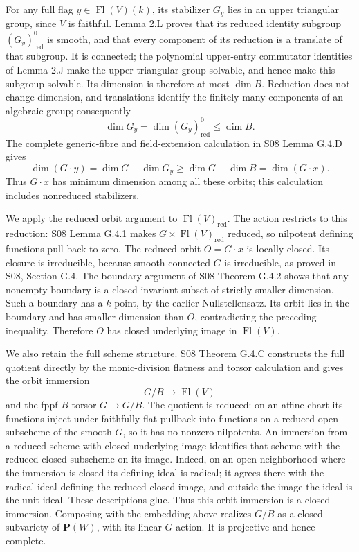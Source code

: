\documentclass[11pt,a4paper,openany]{report}
\newcounter{none}
\begin{document}
For any full flag \(y\in\operatorname{Fl}(V)(k)\), its stabilizer \(G_y\) lies in an upper triangular group, since \(V\) is faithful. Lemma 2.L proves that its reduced identity subgroup \((G_y)_{\mathrm{red}}^0\) is smooth, and that every component of its reduction is a translate of that subgroup. It is connected; the polynomial upper-entry commutator identities of Lemma 2.J make the upper triangular group solvable, and hence make this subgroup solvable. Its dimension is therefore at most \(\dim B\). Reduction does not change dimension, and translations identify the finitely many components of an algebraic group; consequently \[
 \dim G_y=\dim (G_y)_{\mathrm{red}}^0\le\dim B.
\] The complete generic-fibre and field-extension calculation in S08 Lemma G.4.D gives \[
 \dim(G\cdot y)=\dim G-\dim G_y
                       \ge\dim G-\dim B=\dim(G\cdot x).
\] Thus \(G\cdot x\) has minimum dimension among all these orbits; this calculation includes nonreduced stabilizers.

We apply the reduced orbit argument to \(\operatorname{Fl}(V)_{\mathrm{red}}\). The action restricts to this reduction: S08 Lemma G.4.1 makes \(G\times\operatorname{Fl}(V)_{\mathrm{red}}\) reduced, so nilpotent defining functions pull back to zero. The reduced orbit \(O=G\cdot x\) is locally closed. Its closure is irreducible, because smooth connected \(G\) is irreducible, as proved in S08, Section G.4. The boundary argument of S08 Theorem G.4.2 shows that any nonempty boundary is a closed invariant subset of strictly smaller dimension. Such a boundary has a \(k\)-point, by the earlier Nullstellensatz. Its orbit lies in the boundary and has smaller dimension than \(O\), contradicting the preceding inequality. Therefore \(O\) has closed underlying image in \(\operatorname{Fl}(V)\).

We also retain the full scheme structure. S08 Theorem G.4.C constructs the full quotient directly by the monic-division flatness and torsor calculation and gives the orbit immersion \[
             G/B\longrightarrow\operatorname{Fl}(V)
\] and the fppf \(B\)-torsor \(G\to G/B\). The quotient is reduced: on an affine chart its functions inject under faithfully flat pullback into functions on a reduced open subscheme of the smooth \(G\), so it has no nonzero nilpotents. An immersion from a reduced scheme with closed underlying image identifies that scheme with the reduced closed subscheme on its image. Indeed, on an open neighborhood where the immersion is closed its defining ideal is radical; it agrees there with the radical ideal defining the reduced closed image, and outside the image the ideal is the unit ideal. These descriptions glue. Thus this orbit immersion is a closed immersion. Composing with the embedding above realizes \(G/B\) as a closed subvariety of \(\mathbf P(W)\), with its linear \(G\)-action. It is projective and hence complete.
\end{document}
